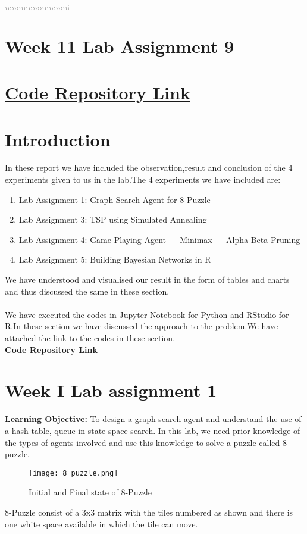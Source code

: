 ,,,,,,,,,,,,,,,,,,,,,,,,,,,;\documentclass[conference]{IEEEtran}
\begin{document}
\section*{\textbf{Week 11 Lab Assignment 9}}
\section*{\textbf{\href{https://github.com/darshh311/CS362_lab}{Code Repository Link}}
}






\section{Introduction}
In these report we have included the observation,result and conclusion of the 4 experiments given to us in the lab.The 4 experiments we have included are:
\begin{enumerate}
    \item  Lab Assignment 1: Graph Search Agent for 8-Puzzle
    \item  Lab Assignment 3: TSP using Simulated Annealing
    \item  Lab Assignment 4: Game Playing Agent — Minimax
— Alpha-Beta Pruning
    \item Lab Assignment 5: Building Bayesian Networks in R
\end{enumerate}
We have understood and visualised our result in the form of tables and charts and thus discussed the same in these section.
\\
\\
We have executed the codes in Jupyter Notebook for Python and RStudio for R.In these section we have discussed the approach to the problem.We have attached the link to the codes in these section.
\\
\textbf{\href{https://github.com/darshh311/CS362_lab}{Code Repository Link}}


\section{Week I Lab assignment 1 }
\textbf{Learning Objective:}
To design a graph search agent and understand the use of a hash table, queue in state space search. In this lab, we need prior knowledge of the types of agents
involved and use this knowledge to solve a puzzle called 8-puzzle.
\begin{figure}[htbp]
\centerline{\texttt{[image: 8 puzzle.png]}}
\caption{Initial and Final state of 8-Puzzle \cite{b2}}
\label{fig}
\end{figure}
8-Puzzle consist of a 3x3 matrix with the tiles numbered as shown and there is one white space available in which the tile can move.
\end{document}
